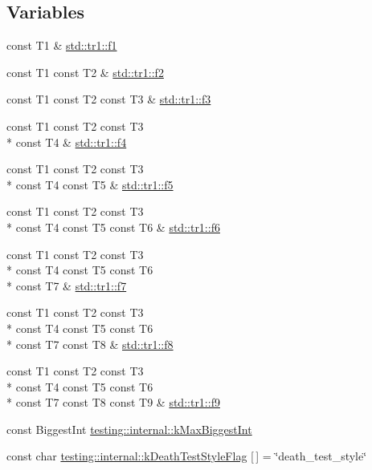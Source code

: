 \subsection*{Variables}
\begin{DoxyCompactItemize}
\item 
const T1 \& \hyperlink{namespacestd_1_1tr1_a9c0fa65b105f8e2f58ba59ecf75fd000}{std\-::tr1\-::f1}
\item 
const T1 const T2 \& \hyperlink{namespacestd_1_1tr1_a87dd9e009868361317f587126dba63d4}{std\-::tr1\-::f2}
\item 
const T1 const T2 const T3 \& \hyperlink{namespacestd_1_1tr1_a0f7c3b47d27d42d82d1a333ea420ce4e}{std\-::tr1\-::f3}
\item 
const T1 const T2 const T3 \\*
const T4 \& \hyperlink{namespacestd_1_1tr1_adc796e02b7385d526aff708189564f67}{std\-::tr1\-::f4}
\item 
const T1 const T2 const T3 \\*
const T4 const T5 \& \hyperlink{namespacestd_1_1tr1_a9c1eb66b2b2fa321942af95405232a0d}{std\-::tr1\-::f5}
\item 
const T1 const T2 const T3 \\*
const T4 const T5 const T6 \& \hyperlink{namespacestd_1_1tr1_a6b62f32e1e3e21bceb94eb46c4cbfd56}{std\-::tr1\-::f6}
\item 
const T1 const T2 const T3 \\*
const T4 const T5 const T6 \\*
const T7 \& \hyperlink{namespacestd_1_1tr1_a2185f3a1c07f2df072c39cb91ffa89a4}{std\-::tr1\-::f7}
\item 
const T1 const T2 const T3 \\*
const T4 const T5 const T6 \\*
const T7 const T8 \& \hyperlink{namespacestd_1_1tr1_ab998afa41cea8d6d26d7e4288b0bf974}{std\-::tr1\-::f8}
\item 
const T1 const T2 const T3 \\*
const T4 const T5 const T6 \\*
const T7 const T8 const T9 \& \hyperlink{namespacestd_1_1tr1_a5a31905861d0f793ee32942d6e3f5d72}{std\-::tr1\-::f9}
\item 
const Biggest\-Int \hyperlink{namespacetesting_1_1internal_ad901880198832bc166d2493096b451f7}{testing\-::internal\-::k\-Max\-Biggest\-Int}
\item 
const char \hyperlink{namespacetesting_1_1internal_a8be730bac57cfd5a92d4aeea57ad499e}{testing\-::internal\-::k\-Death\-Test\-Style\-Flag} \mbox{[}$\,$\mbox{]} = \char`\"{}death\-\_\-test\-\_\-style\char`\"{}

\end{DoxyCompactItemize}
